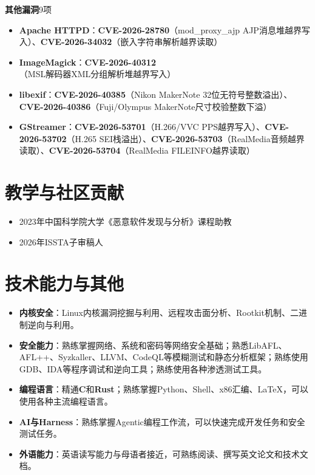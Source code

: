 \documentclass[10pt, a4paper]{article}
\newcommand{\resumeentry}[2]{%
  \noindent\textbf{#1}\hfill #2\par\vspace{1pt}
}
\newcommand{\sectionicon}[2]{%
  \section{\texorpdfstring{\textcolor{accent}{#1}\enspace #2}{#2}}%
}
\begin{document}
\vspace{2pt}

\resumeentry{其他漏洞}{9项}

\begin{itemize}
  \item \textbf{Apache HTTPD}：\textbf{CVE-2026-28780}（mod\_proxy\_ajp AJP消息堆越界写入）、\textbf{CVE-2026-34032}（嵌入字符串解析越界读取）
  \item \textbf{ImageMagick}：\textbf{CVE-2026-40312}（MSL解码器XML分组解析堆越界写入）
  \item \textbf{libexif}：\textbf{CVE-2026-40385}（Nikon MakerNote 32位无符号整数溢出）、\textbf{CVE-2026-40386}（Fuji/Olympus MakerNote尺寸校验整数下溢）
  \item \textbf{GStreamer}：\textbf{CVE-2026-53701}（H.266/VVC PPS越界写入）、\textbf{CVE-2026-53702}（H.265 SEI栈溢出）、\textbf{CVE-2026-53703}（RealMedia音频越界读取）、\textbf{CVE-2026-53704}（RealMedia FILEINFO越界读取）
\end{itemize}

\sectionicon{}{教学与社区贡献}

\begin{itemize}
  \item 2023年中国科学院大学《恶意软件发现与分析》课程助教
  \item 2026年ISSTA子审稿人
\end{itemize}

\sectionicon{}{技术能力与其他}

\begin{itemize}
  \item \textbf{内核安全}：Linux内核漏洞挖掘与利用、远程攻击面分析、Rootkit机制、二进制逆向与利用。
  \item \textbf{安全能力}：熟练掌握网络、系统和密码等网络安全基础；熟悉LibAFL、AFL++、Syzkaller、LLVM、CodeQL等模糊测试和静态分析框架；熟练使用GDB、IDA等程序调试和逆向工具；熟练使用各种渗透测试工具。
  \item \textbf{编程语言}：精通\textbf{C}和\textbf{Rust}；熟练掌握Python、Shell、x86汇编、\LaTeX{}，可以使用各种主流编程语言。
  \item \textbf{AI与Harness}：熟练掌握Agentic编程工作流，可以快速完成开发任务和安全测试任务。
  \item \textbf{外语能力}：英语读写能力与母语者接近，可熟练阅读、撰写英文论文和技术文档。
\end{itemize}
\end{document}
